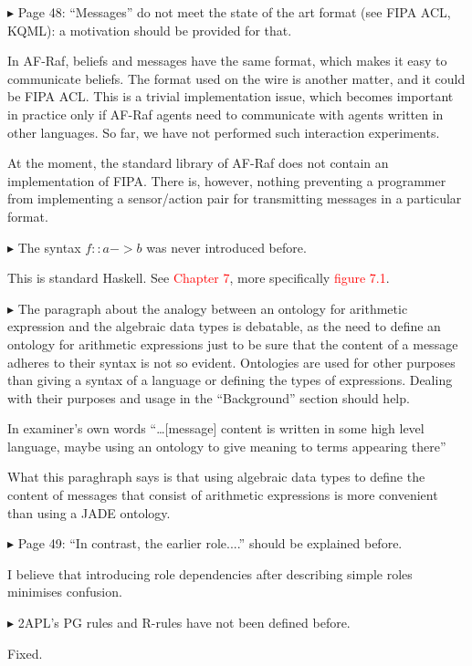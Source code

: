 \documentclass{article}
\newcommand*\R[1]{\textcolor{red}{#1}} %
\newenvironment{them}%
  {\bigskip\noindent\begingroup\color{blue}$\blacktriangleright$\enspace}%
  {\endgroup\par}
\begin{document}
\begin{them}
Page 48:
``Messages'' do not meet the state of the art format (see FIPA ACL, KQML): a
motivation should be provided for that.
\end{them}

In AF-Raf,
  beliefs and messages have the same format,
  which makes it easy to communicate beliefs.
The format used on the wire is another matter,
  and it could be FIPA ACL\null.
This is a trivial implementation issue,
  which becomes important in practice only if AF-Raf agents
  need to communicate with agents written in other languages.
So far, we have not performed such interaction experiments.

At the moment,
  the standard library of AF-Raf does not contain an implementation of FIPA\null.
There is, however,
  nothing preventing a programmer from implementing a sensor/action pair
  for transmitting messages in a particular format.


\begin{them}
The syntax $f::a->b$ was never introduced before.
\end{them}
This is standard Haskell. See \R{Chapter 7}, more specifically \R{figure 7.1}.

\begin{them}
The paragraph about the analogy between an ontology for arithmetic expression
and the algebraic data types is debatable, as the need to define an ontology
for arithmetic expressions just to be sure that the content of a message
adheres to their syntax is not so evident. Ontologies are used for other
purposes than giving a syntax of a language or defining the types of
expressions. Dealing with their purposes and usage in the ``Background'' section
should help.
\end{them}
In examiner's own words ``\ldots [message] content is written in some high
level language, maybe using an ontology to give meaning to terms appearing
there''

What this paraghraph says is that using algebraic data types to define the
content of messages that consist of arithmetic expressions is more convenient
than using a JADE ontology.

\begin{them}
Page 49:
``In contrast, the earlier role....'' should be explained before.
\end{them}
I believe that introducing role dependencies after describing simple roles
minimises confusion.

\begin{them}
2APL's PG rules and R-rules have not been defined before.
\end{them}
Fixed.
\end{document}
